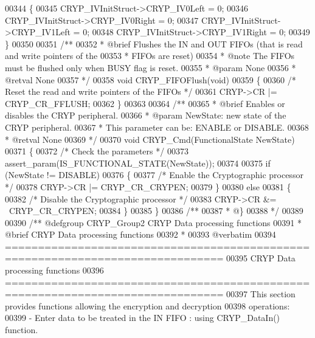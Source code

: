 \begin{DoxyCode}
00344 \{
00345   CRYP\_IVInitStruct->CRYP_IV0Left  = 0;
00346   CRYP\_IVInitStruct->CRYP_IV0Right = 0;
00347   CRYP\_IVInitStruct->CRYP_IV1Left  = 0;
00348   CRYP\_IVInitStruct->CRYP_IV1Right = 0;
00349 \}
00350 
00351 \textcolor{comment}{/**}
00352 \textcolor{comment}{  * @brief  Flushes the IN and OUT FIFOs (that is read and write pointers of the }
00353 \textcolor{comment}{  *         FIFOs are reset)}
00354 \textcolor{comment}{  * @note   The FIFOs must be flushed only when BUSY flag is reset.  }
00355 \textcolor{comment}{  * @param  None}
00356 \textcolor{comment}{  * @retval None}
00357 \textcolor{comment}{  */}
00358 \textcolor{keywordtype}{void} CRYP_FIFOFlush(\textcolor{keywordtype}{void})
00359 \{
00360   \textcolor{comment}{/* Reset the read and write pointers of the FIFOs */}
00361   CRYP->CR |= CRYP_CR_FFLUSH;
00362 \}
00363 
00364 \textcolor{comment}{/**}
00365 \textcolor{comment}{  * @brief  Enables or disables the CRYP peripheral.}
00366 \textcolor{comment}{  * @param  NewState: new state of the CRYP peripheral.}
00367 \textcolor{comment}{  *          This parameter can be: ENABLE or DISABLE.}
00368 \textcolor{comment}{  * @retval None}
00369 \textcolor{comment}{  */}
00370 \textcolor{keywordtype}{void} CRYP_Cmd(FunctionalState NewState)
00371 \{
00372   \textcolor{comment}{/* Check the parameters */}
00373   assert_param(IS\_FUNCTIONAL\_STATE(NewState));
00374 
00375   \textcolor{keywordflow}{if} (NewState != DISABLE)
00376   \{
00377     \textcolor{comment}{/* Enable the Cryptographic processor */}
00378     CRYP->CR |= CRYP_CR_CRYPEN;
00379   \}
00380   \textcolor{keywordflow}{else}
00381   \{
00382     \textcolor{comment}{/* Disable the Cryptographic processor */}
00383     CRYP->CR &= ~CRYP_CR_CRYPEN;
00384   \}
00385 \}
00386 \textcolor{comment}{/**}
00387 \textcolor{comment}{  * @\}}
00388 \textcolor{comment}{  */}
00389 
00390 \textcolor{comment}{/** @defgroup CRYP\_Group2 CRYP Data processing functions}
00391 \textcolor{comment}{ *  @brief    CRYP Data processing functions}
00392 \textcolor{comment}{ *}
00393 \textcolor{comment}{@verbatim    }
00394 \textcolor{comment}{ ===============================================================================}
00395 \textcolor{comment}{                      CRYP Data processing functions}
00396 \textcolor{comment}{ ===============================================================================  }
00397 \textcolor{comment}{  This section provides functions allowing the encryption and decryption }
00398 \textcolor{comment}{  operations: }
00399 \textcolor{comment}{  - Enter data to be treated in the IN FIFO : using CRYP\_DataIn() function.}

\end{DoxyCode}
